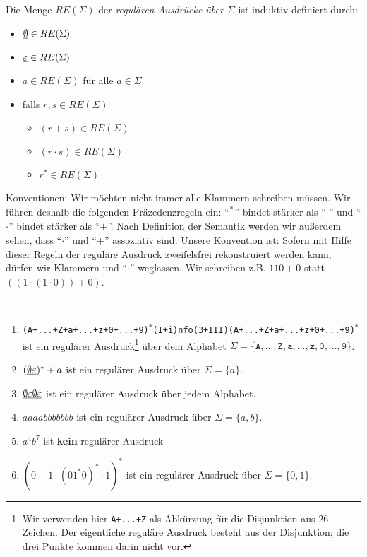 {\begin{Def}[name={[RE($\Sigma$)]}]
        Die Menge $RE(\Sigma)$ der \emph{regulären Ausdrücke über $\Sigma$} ist induktiv definiert durch:
        \begin{itemize}
        \item $\underline{\smash{\emptyset}}\in RE(\Sigma)$
        \item $\underline{\smash{\varepsilon}}\in RE(\Sigma)$
        \item $a\in RE(\Sigma)$ für alle $a\in\Sigma$
        \item falls $r,s\in RE(\Sigma)$
                \begin{itemize}[label=\textbullet]
                \item $(r+s)\in RE(\Sigma)$
                \item $(r\cdot s)\in RE(\Sigma)$
                \item $r^*\in RE(\Sigma)$
                \qedhere
                \end{itemize}
        \end{itemize}
\end{Def}
Konventionen: Wir möchten nicht immer alle Klammern schreiben müssen. 
Wir führen deshalb die folgenden Präzedenzregeln ein: "`$\strut^*$"' bindet stärker als "`$\cdot$"' und "`$\cdot$"' bindet stärker als "`$+$"'.
Nach Definition der Semantik werden wir außerdem sehen, dass "`$\cdot$"' und "`$+$"' assoziativ sind. 
Unsere Konvention ist: 
Sofern mit Hilfe dieser Regeln der reguläre Ausdruck zweifelsfrei rekonstruiert werden kann, dürfen wir Klammern und "`$\cdot$"' weglassen.
Wir schreiben z.B. $110 + 0$ statt $((1\cdot (1\cdot 0)) + 0)$.

\begin{Bsp}~
\begin{enumerate}
 \item \texttt{(A+...+Z+a+...+z+0+...+9)}$^*$\texttt{(I+i)nfo(3+III)(A+...+Z+a+...+z+0+...+9)}$^*$ \linebreak
 ist ein regulärer Ausdruck\footnote{Wir verwenden hier \texttt{A+...+Z} als Abkürzung für die Disjunktion aus 26 Zeichen. 
 Der eigentliche reguläre Ausdruck besteht aus der Disjunktion; die drei Punkte kommen darin nicht vor.}
 über dem Alphabet $\Sigma=\{\texttt{A},\ldots,\texttt{Z},\texttt{a},\ldots,\texttt{z},\texttt{0},\ldots,\texttt{9}\}$.
 \item $(\underline{\smash{\emptyset}}\underline{\smash{\varepsilon}})^*+a$ ist ein regulärer Ausdruck über $\Sigma=\{a\}$.
 \item $\underline{\smash{\emptyset}}\underline{\smash{\varepsilon}}\underline{\smash{\emptyset}}\underline{\smash{\varepsilon}}$ ist ein regulärer Ausdruck über jedem Alphabet.
 \item $aaaabbbbbbb$ ist ein regulärer Ausdruck über $\Sigma=\{a,b\}$.
 \item $a^4b^7$ ist \textbf{kein} regulärer Ausdruck
 \item $(0+1\cdot (01^*0)^*\cdot 1)^*$ ist ein regulärer Ausdruck über $\Sigma=\{0,1\}$.
 \qedhere
\end{enumerate}
\end{Bsp}

}
